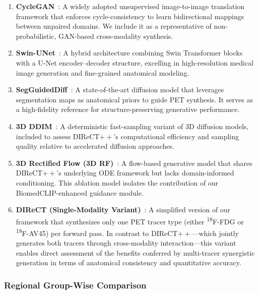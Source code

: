 \documentclass[a4paper]{cas-sc}
\begin{document}
\begin{enumerate}
    \item \textbf{CycleGAN}~\citep{zhu2017unpaired}: A widely adopted unsupervised image-to-image translation framework that enforces cycle-consistency to learn bidirectional mappings between unpaired domains. We include it as a representative of non-probabilistic, GAN-based cross-modality synthesis.

    \item \textbf{Swin-UNet}~\citep{Cao2021swin}: A hybrid architecture combining Swin Transformer blocks with a U-Net encoder–decoder structure, excelling in high-resolution medical image generation and fine-grained anatomical modeling.

    \item \textbf{SegGuidedDiff}~\citep{konz2024anatomically}: A state-of-the-art diffusion model that leverages segmentation maps as anatomical priors to guide PET synthesis. It serves as a high-fidelity reference for structure-preserving generative performance.

    \item \textbf{3D DDIM}~\citep{Graf2023}: A deterministic fast-sampling variant of 3D diffusion models, included to assess DIReCT$++$’s computational efficiency and sampling quality relative to accelerated diffusion approaches.

    \item \textbf{3D Rectified Flow (3D RF)}~\citep{Xing2022}: A flow-based generative model that shares DIReCT$++$’s underlying ODE framework but lacks domain-informed conditioning. This ablation model isolates the contribution of our BiomedCLIP-enhanced guidance module.

    \item \textbf{DIReCT (Single-Modality Variant)}~\citep{liu2025direct}: A simplified version of our framework that synthesizes only one PET tracer type (either \textsuperscript{18}F-FDG or \textsuperscript{18}F-AV45) per forward pass. In contrast to DIReCT$++$—which jointly generates both tracers through cross-modality interaction—this variant enables direct assessment of the benefits conferred by multi-tracer synergistic generation in terms of anatomical consistency and quantitative accuracy.
\end{enumerate}
\subsubsection{Regional Group-Wise Comparison}
\end{document}
